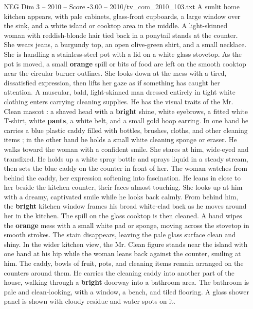 \begin{textsample}{NEG Dim 3 – 2010 – Score -3.00 – 2010/tv\_com\_2010\_103.txt}  \label{ex:f3_neg_007}
A sunlit home kitchen appears, with pale cabinets, glass-front cupboards, a large window over the sink, and a white island or cooktop area in the middle.
A light-skinned woman with reddish-blonde hair tied back in a ponytail stands at the counter.
She wears jeans, a burgundy top, an open olive-green shirt, and a small necklace.
She is handling a stainless-steel pot with a lid on a white glass stovetop.
As the pot is moved, a small \textbf{orange} spill or bits of food are left on the smooth cooktop near the circular burner outlines.
She looks down at the mess with a tired, dissatisfied expression, then lifts her gaze as if something has caught her attention.
A muscular, bald, light-skinned man dressed entirely in tight white clothing enters carrying cleaning supplies.
He has the visual traits of the Mr.
Clean mascot : a shaved head with a \textbf{bright} shine, white eyebrows, a fitted white T-shirt, white \textbf{pants}, a white belt, and a small gold hoop earring.
In one hand he carries a blue plastic caddy filled with bottles, brushes, cloths, and other cleaning items ; in the other hand he holds a small white cleaning sponge or eraser.
He walks toward the woman with a confident smile.
She stares at him, wide-eyed and transfixed.
He holds up a white spray bottle and sprays liquid in a steady stream, then sets the blue caddy on the counter in front of her.
The woman watches from behind the caddy, her expression softening into fascination.
He leans in close to her beside the kitchen counter, their faces almost touching.
She looks up at him with a dreamy, captivated smile while he looks back calmly.
From behind him, the \textbf{bright} kitchen window frames his broad white-clad back as he moves around her in the kitchen.
The spill on the glass cooktop is then cleaned.
A hand wipes the \textbf{orange} mess with a small white pad or sponge, moving across the stovetop in smooth strokes.
The stain disappears, leaving the pale glass surface clean and shiny.
In the wider kitchen view, the Mr.
Clean figure stands near the island with one hand at his hip while the woman leans back against the counter, smiling at him.
The caddy, bowls of fruit, pots, and cleaning items remain arranged on the counters around them.
He carries the cleaning caddy into another part of the house, walking through a \textbf{bright} doorway into a bathroom area.
The bathroom is pale and clean-looking, with a window, a bench, and tiled flooring.
A glass shower panel is shown with cloudy residue and water spots on it.

\end{textsample}
